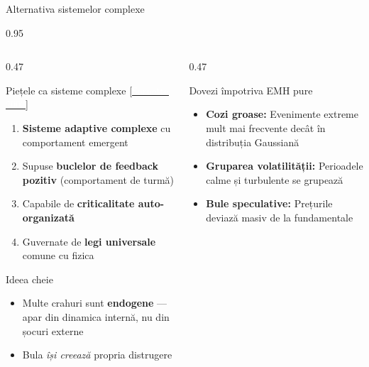 \documentclass[9pt, aspectratio=169, t]{beamer}
\begin{document}
\begin{frame}{Alternativa sistemelor complexe}
    \begin{cminipage}{0.95\textwidth}
    {\footnotesize
    \begin{columns}[T]
        \begin{column}{0.47\textwidth}
            \begin{alertblock}{Piețele ca sisteme complexe {\scriptsize[\href{https://press.princeton.edu/books/paperback/9780691175959/why-stock-markets-crash}{\textcolor{white}{Sornette, 2003}}]}}
                \begin{enumerate}\setlength{\itemsep}{0pt}
                    \item \textbf{Sisteme adaptive complexe} cu comportament emergent
                    \item Supuse \textbf{buclelor de feedback pozitiv} (comportament de turmă)
                    \item Capabile de \textbf{criticalitate auto-organizată}
                    \item Guvernate de \textbf{legi universale} comune cu fizica
                \end{enumerate}
            \end{alertblock}
            \vspace{-1mm}
            \begin{block}{Ideea cheie}
                \begin{itemize}\setlength{\itemsep}{0pt}
                    \item Multe crahuri sunt \textbf{endogene} --- apar din dinamica internă, nu din șocuri externe
                    \item Bula \textit{își creează} propria distrugere
                \end{itemize}
            \end{block}
        \end{column}
        \begin{column}{0.47\textwidth}
            \begin{exampleblock}{Dovezi împotriva EMH pure}
                \begin{itemize}\setlength{\itemsep}{0pt}
                    \item \textbf{Cozi groase:} Evenimente extreme mult mai frecvente decât în distribuția Gaussiană
                    \item \textbf{Gruparea volatilității:} Perioadele calme și turbulente se grupează
                    \item \textbf{Bule speculative:} Prețurile deviază masiv de la fundamentale

\end{itemize}
\end{exampleblock}
\end{column}
\end{columns}}
\end{cminipage}
\end{frame}
\end{document}
